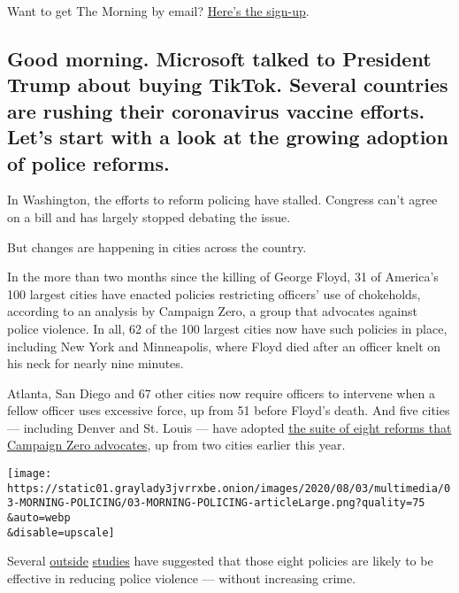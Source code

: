 Want to get The Morning by email?
\href{https://www.nytimes3xbfgragh.onion/newsletters/morning-briefing}{Here's
the sign-up}.

\hypertarget{good-morning-microsoft-talked-to-president-trump-about-buying-tiktok-several-countries-are-rushing-their-coronavirus-vaccine-efforts-lets-start-with-a-look-at-the-growing-adoption-of-police-reforms}{%
\subsection{Good morning. Microsoft talked to President Trump about
buying TikTok. Several countries are rushing their coronavirus vaccine
efforts. Let's start with a look at the growing adoption of police
reforms.}\label{good-morning-microsoft-talked-to-president-trump-about-buying-tiktok-several-countries-are-rushing-their-coronavirus-vaccine-efforts-lets-start-with-a-look-at-the-growing-adoption-of-police-reforms}}

In Washington, the efforts to reform policing have stalled. Congress
can't agree on a bill and has largely stopped debating the issue.

But changes are happening in cities across the country.

In the more than two months since the killing of George Floyd, 31 of
America's 100 largest cities have enacted policies restricting officers'
use of chokeholds, according to an analysis by Campaign Zero, a group
that advocates against police violence. In all, 62 of the 100 largest
cities now have such policies in place, including New York and
Minneapolis, where Floyd died after an officer knelt on his neck for
nearly nine minutes.

Atlanta, San Diego and 67 other cities now require officers to intervene
when a fellow officer uses excessive force, up from 51 before Floyd's
death. And five cities --- including Denver and St. Louis --- have
adopted \href{https://8cantwait.org/}{the suite of eight reforms that
Campaign Zero advocates}, up from two cities earlier this year.

\texttt{[image: https://static01.graylady3jvrrxbe.onion/images/2020/08/03/multimedia/03-MORNING-POLICING/03-MORNING-POLICING-articleLarge.png?quality=75\\\&auto=webp\\\&disable=upscale]}

Several
\href{https://www.ncjrs.gov/pdffiles1/nij/grants/218583.pdf}{outside}
\href{https://static1.squarespace.com/static/5425b9f0e4b0d66352331e0e/t/58e6a753ff7c50ebbad126f8/1491511130661/Ninth+Systemic+Assessment--Use+of+Force--FINAL.pdf}{studies}
have suggested that those eight policies are likely to be effective in
reducing police violence --- without increasing crime.

